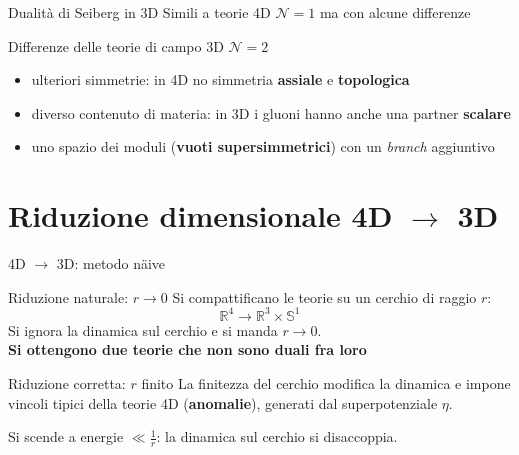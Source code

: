 \documentclass[10pt,compress,usenames,dvipsnames]{beamer}
\begin{document}
\begin{frame}{Dualità di Seiberg in 3D}
Simili a teorie 4D $\mathcal{N}=1$ ma con alcune differenze
\begin{block}{Differenze delle teorie di campo 3D $\mathcal{N}=2$}
\begin{itemize}
\item ulteriori simmetrie: in 4D no simmetria \alert{\bfseries assiale} e \alert{\bfseries topologica} 
\item diverso contenuto di materia: in 3D i gluoni hanno anche una partner \alert{\bfseries scalare} 
\item uno spazio dei moduli (\alert{\bfseries vuoti supersimmetrici}) con un \emph{branch} aggiuntivo  
\end{itemize}
\end{block}
\begin{center}
\end{center}

\end{frame}



\section{Riduzione dimensionale 4D $ \rightarrow$ 3D}






\begin{frame}{4D $ \longrightarrow $ 3D: metodo n\"{a}ive}
\vspace{-0.5cm}
\begin{block}{Riduzione naturale: $r \rightarrow 0$}
Si compattificano le teorie su un cerchio di raggio $r$: $$\mathbb{R}^4 \longrightarrow \mathbb{R}^3 \times \mathbb{S}^1$$
Si ignora la dinamica sul cerchio e si manda $r \rightarrow 0$.\\
\alert{\bfseries  Si ottengono due teorie che non sono duali fra loro}
\end{block}

\begin{block}{Riduzione corretta: $r$ finito}
La finitezza del cerchio modifica la dinamica e impone vincoli tipici della teorie 4D (\alert{\bfseries anomalie}), generati dal superpotenziale $\eta$.\\

\end{block}
Si scende a energie $\ll \frac{1}{r}$: la dinamica sul cerchio si disaccoppia.
\end{frame}
\end{document}
